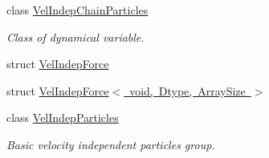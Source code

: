 \begin{DoxyCompactItemize}
class \mbox{\hyperlink{class_space_h_1_1_vel_indep_chain_particles}{Vel\+Indep\+Chain\+Particles}}
\begin{DoxyCompactList}\small\item\em Class of dynamical variable. \end{DoxyCompactList}\item 
struct \mbox{\hyperlink{struct_space_h_1_1_vel_indep_force}{Vel\+Indep\+Force}}
\item 
struct \mbox{\hyperlink{struct_space_h_1_1_vel_indep_force_3_01void_00_01_dtype_00_01_array_size_01_4}{Vel\+Indep\+Force$<$ void, Dtype, Array\+Size $>$}}
\item 
class \mbox{\hyperlink{class_space_h_1_1_vel_indep_particles}{Vel\+Indep\+Particles}}
\begin{DoxyCompactList}\small\item\em Basic velocity independent particles group. \end{DoxyCompactList}\end{DoxyCompactItemize}
